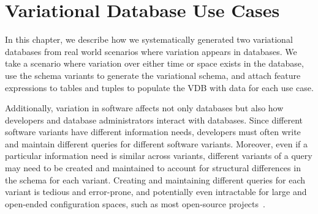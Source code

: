 \chapter{Variational Database Use Cases}
\label{ch:vdbusecase}

In this chapter, we describe how we systematically generated two 
variational databases from real world scenarios where variation appears
in databases. We take a scenario where variation over either time or space
exists in the database, use the schema variants to generate the variational schema, 
and attach feature expressions to tables and tuples to populate the VDB with
data for each use case. 

Additionally, variation in software affects not only databases but also how developers and
database administrators interact with databases.
%
Since different software variants have different information needs, developers
must often write and maintain different queries for different software
variants. Moreover, even if a particular information need is similar across
variants, different variants of a query may need to be created and maintained
to account for structural differences in the schema for each variant.
%
Creating and maintaining different queries for each variant is tedious and
error-prone, and potentially even intractable for large and open-ended
configuration spaces, such as most open-source projects~\cite{dbDecay16Stonebraker}.

